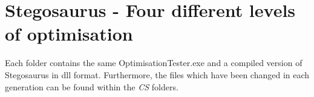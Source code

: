 \chapter{Stegosaurus - Four different levels of optimisation}
\label{app:D}
Each folder contains the same OptimisationTester.exe and a compiled version of Stegosaurus in dll format.
Furthermore, the files which have been changed in each generation can be found within the \textit{CS} folders.

\setlength{\parindent}{0pt} {



}